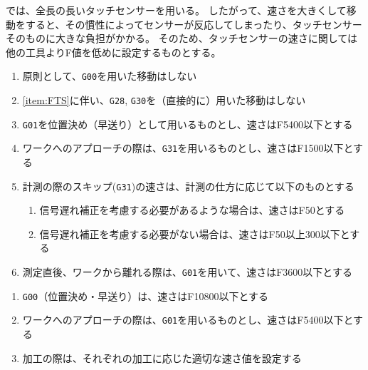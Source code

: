 


\DMname では、全長の長いタッチセンサーを用いる。
したがって、速さを大きくして移動をすると、その慣性によってセンサーが反応してしまったり、タッチセンサーそのものに大きな負担がかかる。
そのため、タッチセンサーの速さに関しては他の工具よりF値を低めに設定するものとする。


\begin{enumerate}[label=\Roman*., ref=\Roman*]
\item\label{item:FTS} 原則として、\verb|G00|を用いた移動はしない
\item \ref{item:FTS}に伴い、\verb|G28|, \verb|G30|を（直接的に）用いた移動はしない
\item \verb|G01|を位置決め（早送り）として用いるものとし、速さはF5400以下とする
\item ワークへのアプローチの際は、\verb|G31|を用いるものとし、速さはF1500以下とする
\item 計測の際のスキップ(\verb|G31|)の速さは、計測の仕方に応じて以下のものとする
  \begin{enumerate}
  \item {}信号遅れ補正を考慮する必要があるような場合は、速さはF50とする
  \item 信号遅れ補正を考慮する必要がない場合は、速さはF50以上300以下とする
  \end{enumerate}
\item 測定直後、ワークから離れる際は、\verb|G01|を用いて、速さはF3600以下とする
\end{enumerate}



\begin{enumerate}[label=\Roman*., ref=\Roman*]
\item \verb|G00|（位置決め・早送り）は、速さはF10800以下とする
\item ワークへのアプローチの際は、\verb|G01|を用いるものとし、速さはF5400以下とする
\item 加工の際は、それぞれの加工に応じた適切な速さ値を設定する
\end{enumerate}
